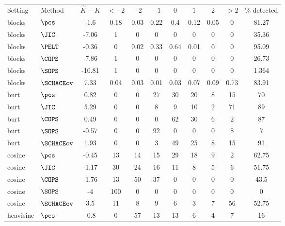 \begin{table}[ht]
\centering
\begin{tabular}{llccccccccc}
 Setting & Method & $\hat{K} - K$ & $< -2$ & $-2$ & $-1$ & $0$ & $1$ & $2$ & $> 2$ & \% detected \\ 
 blocks & $\pcs$ &  -1.6 &  0.18 &  0.03 &  0.22 &   0.4 &  0.12 &  0.05 &     0 & 81.27 \\ 
  blocks & $\JIC$ & -7.06 &     1 &     0 &     0 &     0 &     0 &     0 &     0 & 35.36 \\ 
  blocks & $\PELT$ & -0.36 &     0 &  0.02 &  0.33 &  0.64 &  0.01 &     0 &     0 & 95.09 \\ 
  blocks & $\COPS$ & -7.86 &     1 &     0 &     0 &     0 &     0 &     0 &     0 & 26.73 \\ 
   \hline
blocks & $\SOPS$ & -10.81 &     1 &     0 &     0 &     0 &     0 &     0 &     0 & 1.364 \\ 
  blocks & $\SCHACEcv$ &  7.33 &  0.04 &  0.03 &  0.01 &  0.03 &  0.07 &  0.09 &  0.73 & 83.91 \\ 
   \hline
burt & $\pcs$ &  0.82 &     0 &     0 &    27 &    30 &    20 &     8 &    15 &    70 \\ 
  burt & $\JIC$ &  5.29 &     0 &     0 &     8 &     9 &    10 &     2 &    71 &    89 \\ 
   \hline
burt & $\COPS$ &  0.49 &     0 &     0 &     0 &    62 &    30 &     6 &     2 &    87 \\ 
  burt & $\SOPS$ & -0.57 &     0 &     0 &    92 &     0 &     0 &     0 &     8 &     7 \\ 
  burt & $\SCHACEcv$ &  1.93 &     0 &     0 &     3 &    49 &    25 &     8 &    15 &    91 \\ 
  cosine & $\pcs$ & -0.45 &    13 &    14 &    15 &    29 &    18 &     9 &     2 & 62.75 \\ 
  cosine & $\JIC$ & -1.17 &    30 &    24 &    16 &    11 &     8 &     5 &     6 & 51.75 \\ 
  cosine & $\COPS$ & -1.76 &    13 &    50 &    37 &     0 &     0 &     0 &     0 &  43.5 \\ 
  cosine & $\SOPS$ &    -4 &   100 &     0 &     0 &     0 &     0 &     0 &     0 &     0 \\ 
  cosine & $\SCHACEcv$ &   3.5 &    11 &     8 &     9 &     6 &     3 &     7 &    56 & 52.75 \\ 
  heavisine & $\pcs$ &  -0.8 &     0 &    57 &    13 &    13 &     6 &     4 &     7 &    16 \\ 

\end{tabular}
\end{table}
